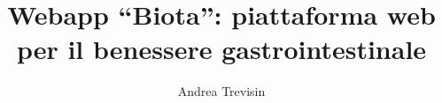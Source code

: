 \title{Webapp ``Biota'': piattaforma web per il benessere gastrointestinale}
\author{Andrea Trevisin}



